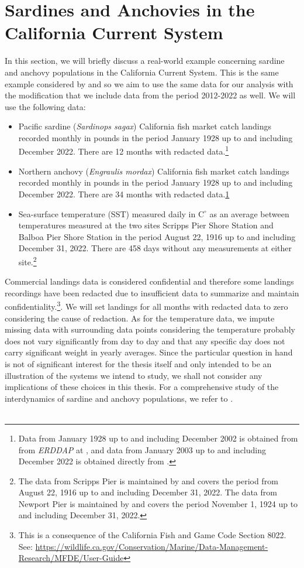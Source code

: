 \documentclass[11pt, a4paper]{memoir}
\theoremstyle{break}
\theoremstyle{break}
\theoremstyle{nonumberplain}
\begin{document}
\section{Sardines and Anchovies in the California Current System}
In this section, we will briefly discuss a real-world example concerning sardine and anchovy populations in the California Current System. This is the same example considered by \cite{Sugihara} and so we aim to use the same data for our analysis with the modification that we include data from the period 2012-2022 as well. We will use the following data:
\begin{itemize}
\item Pacific sardine (\textit{Sardinops sagax}) California fish market catch landings recorded monthly in pounds in the period January 1928 up to and including December 2022. There are 12 months with redacted data.\footnote{\label{note1}Data from January 1928 up to and including December 2002 is obtained from from \textit{ERDDAP} at \cite{oldData}, and data from January 2003 up to and including December 2022 is obtained directly from \cite{newData}.}
\item Northern anchovy (\textit{Engraulis mordax}) California fish market catch landings recorded monthly in pounds in the period January 1928 up to and including December 2022. There are 34 months with redacted data.\cref{note1} 
\item  Sea-surface temperature (SST) measured daily in $\text{C}^\circ$ as an average between temperatures measured at the two sites Scripps Pier Shore Station and Balboa Pier Shore Station in the period August 22, 1916 up to and including December 31, 2022. There are 458 days without any measurements at either site.\footnote{The data from Scripps Pier is maintained by \cite{Scripps} and covers the period from August 22, 1916 up to and including December 31, 2022. The data from Newport Pier is maintained by \cite{Newport} and covers the period November 1, 1924 up to and including December 31, 2022.} 
\end{itemize}
Commercial landings data is considered confidential and therefore some landings recordings have been redacted due to insufficient data to summarize and maintain confidentiality.\footnote{This is a consequence of the California Fish and Game Code Section 8022. See: \url{https://wildlife.ca.gov/Conservation/Marine/Data-Management-Research/MFDE/User-Guide}}. We will set landings for all months with redacted data to zero considering the cause of redaction. As for the temperature data, we impute missing data with surrounding data points considering the temperature probably does not vary significantly from day to day and that any specific day does not carry significant weight in yearly averages. Since the particular question in hand is not of significant interest for the thesis itself and only intended to be an illustration of the systems we intend to study, we shall not consider any implications of these choices in this thesis. For a comprehensive study of the interdynamics of sardine and anchovy populations, we refer to \cite{Sardine}.\\\\
\end{document}
